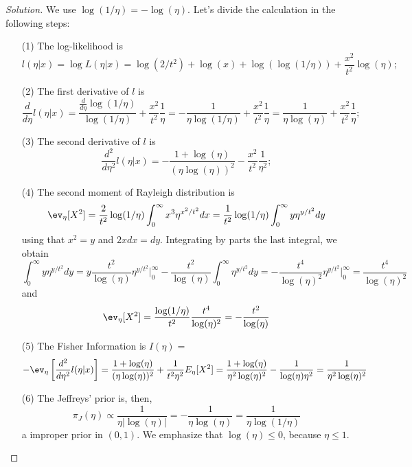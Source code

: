 \begin{proof}[Solution] We use $\log(1/\eta) = -\log(\eta)$. Let's divide the calculation in the following steps:
    \begin{enumerate}
        \item[(1)] The log-likelihood is
         $$l(\eta|x) = \log L(\eta|x) = \log(2/t^2) + \log(x) +
        \log(\log(1/\eta)) + \frac{x^2}{t^2}\log(\eta);$$
        \item[(2)] The first derivative of $l$ is $$\frac{d}{d\eta} l(\eta|x)
        = \frac{\frac{d}{d\eta}\log(1/\eta)}{\log(1/\eta)} +
        \frac{x^2}{t^2}\frac{1}{\eta} = -\frac{1}{\eta\log(1/\eta)} +
        \frac{x^2}{t^2}\frac{1}{\eta} = \frac{1}{\eta\log(\eta)} +
        \frac{x^2}{t^2}\frac{1}{\eta};$$
        \item[(3)] The second derivative of $l$ is $$\frac{d^2}{d\eta^2}
        l(\eta|x)=-\frac{1 + \log(\eta)}{(\eta\log(\eta))^2} -
        \frac{x^2}{t^2}\frac{1}{\eta^2};$$
        \item[(4)] The second moment of Rayleigh distribution is
        $$\ev_{\eta}[X^2] = \frac{2}{t^2}\log(1/\eta)\int_0^{\infty}
        x^3\eta^{x^2/t^2} dx = \frac{1}{t^2}\log(1/\eta)\int_0^{\infty}
        y\eta^{y/t^2} dy$$
        using that $x^2 = y$ and $2x dx = dy$. Integrating by parts the last
        integral, we obtain 
        $$
        \int_0^{\infty} y\eta^{y/t^2} dy = y\frac{t^2}{\log(\eta)}\eta^{y/t^2}\bigg|_0^{\infty} - \frac{t^2}{\log(\eta)}\int_0^{\infty} \eta^{y/t^2} dy = -\frac{t^4}{\log(\eta)^2}\eta^{y/t^2}\bigg|_0^{\infty} = \frac{t^4}{\log(\eta)^2}
        $$
        and 
        $$\ev_{\eta}[X^2] =\frac{\log(1/\eta)}{t^2}\frac{t^4}{\log(\eta)^2} = -\frac{t^2}{\log(\eta)}$$
        \item[(5)] The Fisher Information is $I(\eta)=$ $$-\ev_{\eta}\left[\frac{d^2}{d\eta^2}
        l(\eta|x)\right] = \frac{1 + \log(\eta)}{(\eta\log(\eta))^2} +
        \frac{1}{t^2\eta^2}E_{\eta}[X^2] = \frac{1 + \log(\eta)}{\eta^2\log(\eta)^2} -
        \frac{1}{\log(\eta)\eta^2} = \frac{1}{\eta^2\log(\eta)^2}$$
        \item[(6)] The Jeffreys' prior is, then, $$\pi_J(\eta) \propto
        \frac{1}{\eta|\log(\eta)|} = -\frac{1}{\eta\log(\eta)} =
        \frac{1}{\eta\log(1/\eta)}$$
        a improper prior in $(0,1)$. We emphasize that $\log(\eta) \le 0$,
        because $\eta \le 1$. 
    \end{enumerate}
\end{proof}